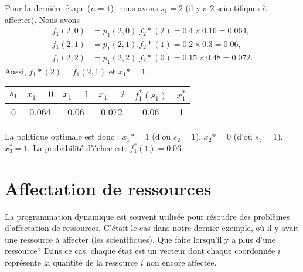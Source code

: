 \begin{example}
Pour la dernière étape ($n = 1$), nous avons $s_1 = 2$ (il y a 2 scientifiques à affecter).
Nous avons
\begin{align*}
 f_1(2,0) &= p_1(2,0).f_2*(2) = 0.4 \times 0.16 = 0.064, \\
 f_1(2,1) &= p_1(2,1).f_2*(1) = 0.2 \times 0.3 = 0.06, \\
 f_1(2,2) &= p_1(2,2).f_2*(0) = 0.15 \times 0.48 = 0.072.
\end{align*}
Aussi, $f_1*(2) = f_1(2,1)$ et $x_1* = 1$.
\begin{tabular}{|c|c|c|c|c|c|}
$s_1$ & $x_1 = 0$ & $x_1 = 1$ & $x_1 = 2$ & $f_1^*(s_1)$ & $x_1^*$ \\
\hline
0 & 0.064 & 0.06 & 0.072 & 0.06 & 1 \\
\end{tabular}
La politique optimale est donc :
$x_1* = 1$ (d’où $s_2 = 1$), $x_2* = 0$ (d’où $s_3 = 1$), $x_3^* = 1$.
 La probabilité d’échec est: $f_1^*(1) = 0.06$.
\end{example}

\section{Affectation de ressources}

La programmation dynamique est souvent utilisée pour résoudre des problèmes d’affectation de ressources.
C’était le cas dans notre dernier exemple, où il y avait une ressource à affecter (les scientifiques).
Que faire lorsqu’il y a plus d’une ressource?
Dans ce cas, chaque état est un vecteur dont chaque coordonnée $i$ représente la quantité de la ressource $i$ non encore affectée.

